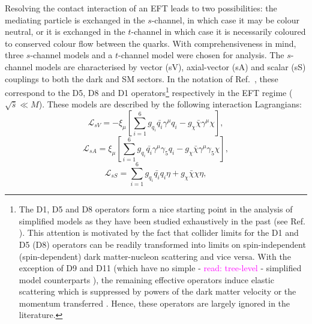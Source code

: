 \begin{flushleft}
Resolving the contact interaction of an EFT leads to two possibilities: the mediating particle is exchanged in the $s$-channel, in which case it may be colour neutral, or it is exchanged in the $t$-channel in which case it is necessarily coloured to conserved colour flow between the quarks. With comprehensiveness in mind, three $s$-channel models and a $t$-channel model were chosen for analysis. The $s$-channel models are characterised by vector (sV), axial-vector (sA) and scalar (sS) couplings to both the dark and SM sectors. In the notation of Ref.~\cite{DMCons2}, these correspond to the D5, D8 and D1 operators\footnote{The D1, D5 and D8 operators form a nice starting point in the analysis of simplified models as they have been studied exhaustively in the past (see Ref. \cite{}).  This attention is motivated by the fact that collider limits for the D1 and D5 (D8) operators can be readily transformed into limits on spin-independent (spin-dependent) dark matter-nucleon scattering and vice versa. With the exception of D9 and D11 (which have no simple - \textcolor{magenta}{read: tree-level} - simplified model counterparts \cite{}), the remaining effective operators induce elastic scattering which is suppressed by powers of the dark matter velocity or the momentum transferred \cite{Kumar}. Hence, these operators are largely ignored in the literature.}  respectively in the EFT regime ($\sqrt{\hat{s}} \ll M$).  These models are described by the following interaction Lagrangians:
\begin{equation}
\label{L_int_sV}
\mathcal{L}_{sV} = - \xi_{\mu}\left[ \sum\limits_{i=1}^{6} g_{q_i}\bar{q_i}\gamma^{\mu}q_i - g_{\chi}\bar{\chi}\gamma^{\mu}\chi\right],
\end{equation}
\begin{equation}
\label{L_int_sA}
\mathcal{L}_{sA} =  \xi_{\mu}\left[\sum\limits_{i=1}^{6} g_{q_i}\bar{q_i}\gamma^{\mu}\gamma_{5}q_i - g_{\chi}\bar{\chi}\gamma^{\mu}\gamma_{5}\chi\right],
\end{equation}
\begin{equation}
\label{L_int_sS}
\mathcal{L}_{sS} = \sum\limits_{i=1}^{6} g_{q_i}\bar{q_i}q_i\eta + g_{\chi}\bar{\chi}\chi\eta,
\end{equation}

\end{flushleft}
